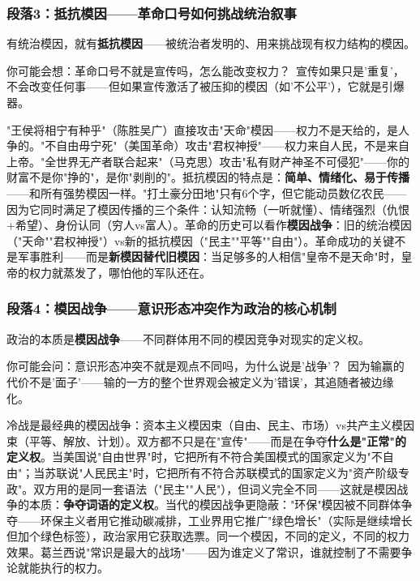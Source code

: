 \documentclass[../main.tex]{subfiles}
\begin{document}
	\subsubsection*{段落3：抵抗模因——革命口号如何挑战统治叙事}

	有统治模因，就有\textbf{抵抗模因}——被统治者发明的、用来挑战现有权力结构的模因。

	\begin{tcolorbox}[colback=yellow!5, title=\textit{读者行为预测}]

		你可能会想：革命口号不就是宣传吗，怎么能改变权力？\ 宣传如果只是'重复'，不会改变任何事——但如果宣传激活了被压抑的模因（如'不公平'），它就是引爆器。

	\end{tcolorbox}

"王侯将相宁有种乎"（陈胜吴广）直接攻击"天命"模因——权力不是天给的，是人争的。"不自由毋宁死"（美国革命）攻击"君权神授"——权力来自人民，不是来自上帝。"全世界无产者联合起来"（马克思）攻击"私有财产神圣不可侵犯"——你的财富不是你"挣的"，是你"剥削的"。抵抗模因的特点是：\textbf{简单、情绪化、易于传播}——和所有强势模因一样。"打土豪分田地"只有6个字，但它能动员数亿农民——因为它同时满足了模因传播的三个条件：认知流畅（一听就懂）、情绪强烈（仇恨+希望）、身份认同（穷人vs富人）。革命的历史可以看作\textbf{模因战争}：旧的统治模因（"天命""君权神授"）vs新的抵抗模因（"民主""平等""自由"）。革命成功的关键不是军事胜利——而是\textbf{新模因替代旧模因}：当足够多的人相信"皇帝不是天命"时，皇帝的权力就蒸发了，哪怕他的军队还在。

	\subsubsection*{段落4：模因战争——意识形态冲突作为政治的核心机制}

	政治的本质是\textbf{模因战争}——不同群体用不同的模因竞争对现实的定义权。

	\begin{tcolorbox}[colback=yellow!5, title=\textit{读者行为预测}]

		你可能会问：意识形态冲突不就是观点不同吗，为什么说是'战争'？\ 因为输赢的代价不是'面子'——输的一方的整个世界观会被定义为'错误'，其追随者被边缘化。

	\end{tcolorbox}

冷战是最经典的模因战争：资本主义模因束（自由、民主、市场）vs共产主义模因束（平等、解放、计划）。双方都不只是在"宣传"——而是在争夺\textbf{什么是"正常"的定义权}。当美国说"自由世界"时，它把所有不符合美国模式的国家定义为"不自由"；当苏联说"人民民主"时，它把所有不符合苏联模式的国家定义为"资产阶级专政"。双方用的是同一套语法（"民主""人民"），但词义完全不同——这就是模因战争的本质：\textbf{争夺词语的定义权}。当代的模因战争更隐蔽："环保"模因被不同群体争夺——环保主义者用它推动碳减排，工业界用它推广"绿色增长"（实际是继续增长但加个绿色标签），政治家用它获取选票。同一个模因，不同的定义，不同的权力效果。葛兰西说"常识是最大的战场"——因为谁定义了常识，谁就控制了不需要争论就能执行的权力。
\end{document}
